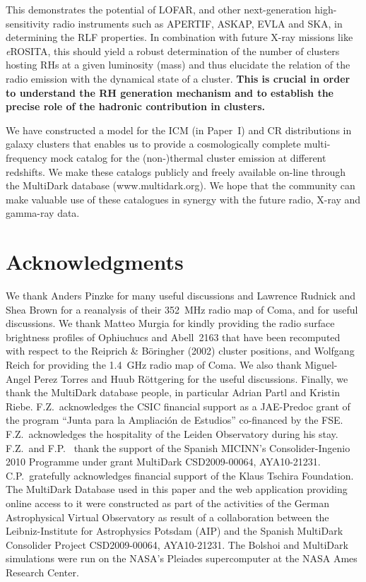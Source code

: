 \documentclass[useAMS,usenatbib]{mn2e}
\begin{document}
This demonstrates the potential of LOFAR, and other next-generation
high-sensitivity radio instruments such as APERTIF, ASKAP, EVLA and SKA, in
determining the RLF properties. In combination with future X-ray missions like
\emph{e}ROSITA, this should yield a robust determination of the number of
clusters hosting RHs at a given luminosity (mass) and thus elucidate the
relation of the radio emission with the dynamical state of a cluster.
{\bf This is crucial in order to understand the RH generation mechanism and to
establish the precise role of the hadronic contribution in clusters.}

We have constructed a model for the ICM (in Paper~I) and CR distributions 
in galaxy clusters that enables us to provide a cosmologically complete multi-frequency mock 
catalog for the \mbox{(non-)thermal} cluster emission at different redshifts. We make these 
catalogs publicly and freely available on-line through the MultiDark database (www.multidark.org). 
We hope that the community can make valuable use of these catalogues in
synergy with the future radio, X-ray and gamma-ray data.


\section*{Acknowledgments}
We thank Anders Pinzke for many useful discussions and Lawrence Rudnick and Shea
Brown for a reanalysis of their 352~MHz radio map of Coma, and for useful
discussions. We thank Matteo Murgia for kindly providing the radio surface
brightness profiles of Ophiuchucs and Abell~2163 that have been recomputed with
respect to the Reiprich \& B\"{o}ringher (2002) cluster positions, and Wolfgang
Reich for providing the 1.4~GHz radio map of Coma.  We also thank Miguel-Angel
Perez Torres and Huub R{\"o}ttgering for the useful discussions.  Finally, we
thank the MultiDark database people, in particular Adrian Partl and Kristin
Riebe.  F.Z.{\ }acknowledges the CSIC financial support as a JAE-Predoc grant of
the program ``Junta para la Ampliaci\'on de Estudios'' co-financed by the FSE.
F.Z.{\ }acknowledges the hospitality of the Leiden Observatory during his stay.
F.Z.{\ }and F.P.{\ } thank the support of the Spanish MICINN's
Consolider-Ingenio 2010 Programme under grant MultiDark CSD2009-00064, AYA10-21231. 
C.P.{\ }gratefully acknowledges financial support of the Klaus Tschira Foundation. The
MultiDark Database used in this paper and the web application providing online
access to it were constructed as part of the activities of the German
Astrophysical Virtual Observatory as result of a collaboration between the
Leibniz-Institute for Astrophysics Potsdam (AIP) and the Spanish MultiDark
Consolider Project CSD2009-00064, AYA10-21231. The Bolshoi and MultiDark simulations 
were run on the NASA's Pleiades supercomputer at the NASA Ames Research Center.
\end{document}
